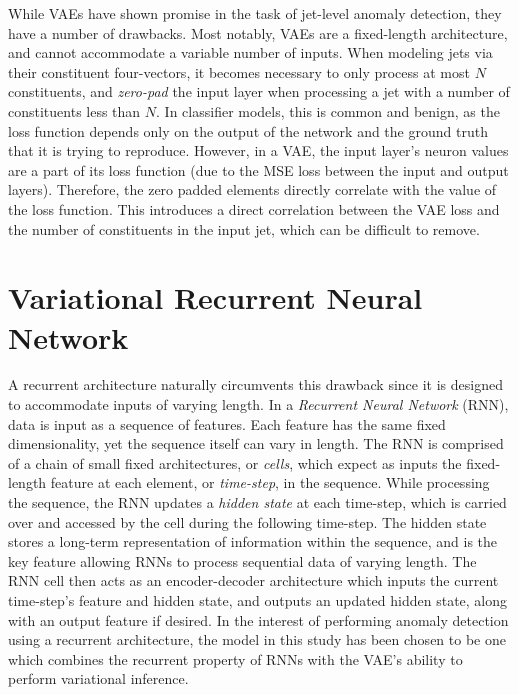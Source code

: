 \documentclass[11pt, a4paper]{article}
\begin{document}
While VAEs have shown promise in the task of jet-level anomaly detection, they have a number of drawbacks. 
Most notably, VAEs are a fixed-length architecture, and cannot accommodate a variable number of inputs. 
When modeling jets via their constituent four-vectors, it becomes necessary to only process at most $N$ constituents, and \textit{zero-pad} the input layer when processing a jet with a number of constituents less than $N$. 
In classifier models, this is common and benign, as the loss function depends only on the output of the network and the ground truth that it is trying to reproduce. 
However, in a VAE, the input layer's neuron values are a part of its loss function (due to the MSE loss between the input and output layers).
Therefore, the zero padded elements directly correlate with the value of the loss function. 
This introduces a direct correlation between the VAE loss and the number of constituents in the input jet, which can be difficult to remove. 



\section{Variational Recurrent Neural Network}

A recurrent architecture naturally circumvents this drawback since it is designed to accommodate inputs of varying length. 
In a \textit{Recurrent Neural Network} (RNN), data is input as a sequence of features. Each feature has the same fixed dimensionality, yet the sequence itself can vary in length. 
The RNN is comprised of a chain of small fixed architectures, or \textit{cells}, which expect as inputs the fixed-length feature at each element, or \textit{time-step}, in the sequence. 
While processing the sequence, the RNN updates a \textit{hidden state} at each time-step, which is carried over and accessed by the cell during the following time-step. 
The hidden state stores a long-term representation of information within the sequence, and is the key feature allowing RNNs to process sequential data of varying length. 
The RNN cell then acts as an encoder-decoder architecture which inputs the current time-step's feature and hidden state, and outputs an updated hidden state, along with an output feature if desired. 
In the interest of performing anomaly detection using a recurrent architecture, the model in this study has been chosen to be one which combines the recurrent property of RNNs with the VAE's ability to perform variational inference. 
\end{document}
